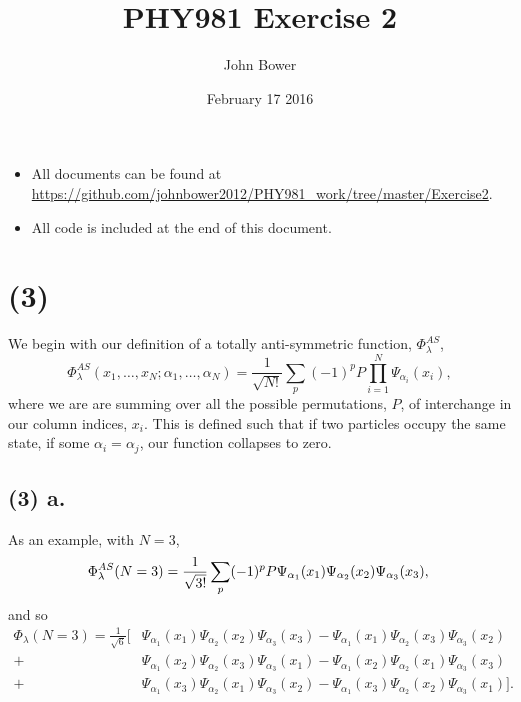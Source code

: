 \documentclass[11 pt, a4paper]{article}
\title{PHY981 Exercise 2}
\author{John Bower}
\date{February 17 2016}
\begin{document}
\maketitle

\begin{itemize}
\item All documents can be found at \url{https://github.com/johnbower2012/PHY981_work/tree/master/Exercise2}.
\item All code is included at the end of this document.
\end{itemize}

\section*{(3)}

We begin with our definition of a totally anti-symmetric function, $\Phi_{\lambda}^{AS}$,
\begin{equation*}
\Phi_{\lambda}^{AS}(x_1,\dots,x_N;\alpha_1,\dots,\alpha_N) = \frac{1}{\sqrt{N!}}\sum\limits_p (-1)^p P\prod\limits_{i=1}^N \Psi_{\alpha_i}(x_i),
\end{equation*}
where we are are summing over all the possible permutations, $P$, of interchange in our column indices, $x_i$. This is defined such that if two particles occupy the same state, if some $\alpha_i=\alpha_j$, our function collapses to zero.

\subsection*{(3) a.}
As an example, with $N=3$,
\begin{equation*}
\Phi_{\lambda}^{AS}(N=3) = \frac{1}{\sqrt{3!}} \sum\limits_p (-1)^p P \Psi_{\alpha_1}(x_1) \Psi_{\alpha_2}(x_2) \Psi_{\alpha_3}(x_3), \\
\end{equation*}
and so 
\begin{align*}
\Phi_{\lambda}(N=3) = \frac{1}{\sqrt{6}} \bigg[& \Psi_{\alpha_1}(x_1)\Psi_{\alpha_2}(x_2)\Psi_{\alpha_3}(x_3) - \Psi_{\alpha_1}(x_1)\Psi_{\alpha_2}(x_3)\Psi_{\alpha_3}(x_2) \\
				 	+& \Psi_{\alpha_1}(x_2)\Psi_{\alpha_2}(x_3)\Psi_{\alpha_3}(x_1) - \Psi_{\alpha_1}(x_2)\Psi_{\alpha_2}(x_1)\Psi_{\alpha_3}(x_3) \\
					+& \Psi_{\alpha_1}(x_3)\Psi_{\alpha_2}(x_1)\Psi_{\alpha_3}(x_2) - \Psi_{\alpha_1}(x_3)\Psi_{\alpha_2}(x_2)\Psi_{\alpha_3}(x_1) \bigg].
\end{align*}
\end{document}
